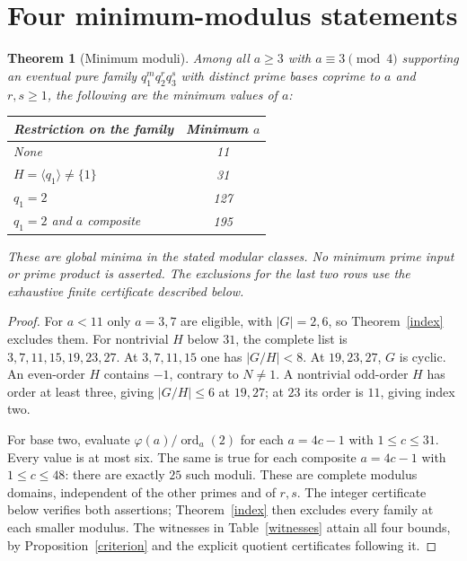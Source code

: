 \documentclass[11pt,a4paper]{article}
\newtheorem{theorem}{Theorem}
\theoremstyle{definition}\newtheorem{definition}[theorem]{Definition}
\newcommand{\ord}{\operatorname{ord}}
\begin{document}
\section{Four minimum-modulus statements}
\begin{theorem}[Minimum moduli]\label{minima}
Among all $a\ge3$ with $a\equiv3\pmod4$ supporting an eventual pure family $q_1^m q_2^r q_3^s$ with distinct prime bases coprime to $a$ and $r,s\ge1$, the following are the minimum values of $a$:
\begin{center}
\begin{tabular}{@{}lc@{}}\toprule
Restriction on the family & Minimum $a$\\\midrule
None & 11\\
$H=\langle q_1\rangle\ne\{1\}$ & 31\\
$q_1=2$ & 127\\
$q_1=2$ and $a$ composite & 195\\\bottomrule
\end{tabular}
\end{center}
These are global minima in the stated modular classes. No minimum prime input or prime product is asserted. The exclusions for the last two rows use the exhaustive finite certificate described below.
\end{theorem}
\begin{proof}
For $a<11$ only $a=3,7$ are eligible, with $|G|=2,6$, so Theorem~\ref{index} excludes them. For nontrivial $H$ below $31$, the complete list is $3,7,11,15,19,23,27$. At $3,7,11,15$ one has $|G/H|<8$. At $19,23,27$, $G$ is cyclic. An even-order $H$ contains $-1$, contrary to $N\ne1$. A nontrivial odd-order $H$ has order at least three, giving $|G/H|\le6$ at $19,27$; at $23$ its order is $11$, giving index two.

For base two, evaluate $\varphi(a)/\ord_a(2)$ for each $a=4c-1$ with $1\le c\le31$. Every value is at most six. The same is true for each composite $a=4c-1$ with $1\le c\le48$: there are exactly $25$ such moduli. These are complete modulus domains, independent of the other primes and of $r,s$. The integer certificate below verifies both assertions; Theorem~\ref{index} then excludes every family at each smaller modulus. The witnesses in Table~\ref{witnesses} attain all four bounds, by Proposition~\ref{criterion} and the explicit quotient certificates following it.
\end{proof}
\end{document}
